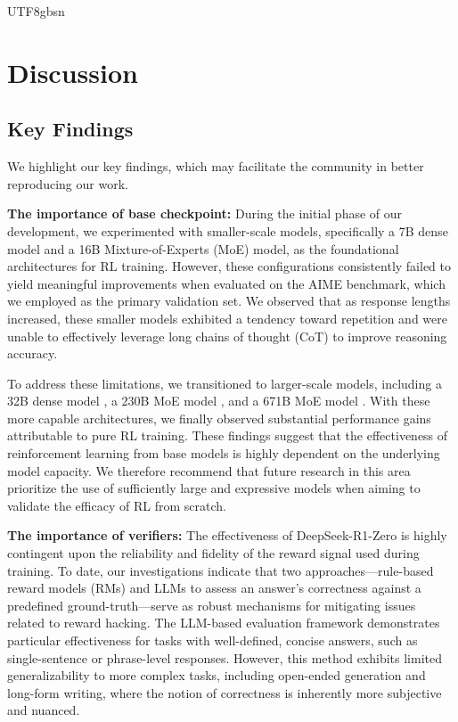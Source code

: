 \documentclass[11pt, a4paper, logo, copyright, nonumbering]{deepseek}
\newcommand{\dsro}{DeepSeek-R1-Zero}
\begin{document}
\begin{CJK*}{UTF8}{gbsn}
\section{Discussion}
\subsection{Key Findings}
We highlight our key findings, which may facilitate the community in better reproducing our work.

\textbf{The importance of base checkpoint: } During the initial phase of our development, we experimented with smaller-scale models, specifically a 7B dense model and a 16B Mixture-of-Experts (MoE) model, as the foundational architectures for RL training. However, these configurations consistently failed to yield meaningful improvements when evaluated on the AIME benchmark, which we employed as the primary validation set. We observed that as response lengths increased, these smaller models exhibited a tendency toward repetition and were unable to effectively leverage long chains of thought (CoT) to improve reasoning accuracy.

To address these limitations, we transitioned to larger-scale models, including a 32B dense model \citep{qwen2_5}, a 230B MoE model \citep{dsvii}, and a 671B MoE model \citep{dsviii}. With these more capable architectures, we finally observed substantial performance gains attributable to pure RL training. These findings suggest that the effectiveness of reinforcement learning from base models is highly dependent on the underlying model capacity. We therefore recommend that future research in this area prioritize the use of sufficiently large and expressive models when aiming to validate the efficacy of RL from scratch.

\textbf{The importance of verifiers: }The effectiveness of \dsro{} is highly contingent upon the reliability and fidelity of the reward signal used during training. To date, our investigations indicate that two approaches—rule-based reward models (RMs) and LLMs to assess an answer’s correctness against a predefined ground-truth—serve as robust mechanisms for mitigating issues related to reward hacking. The LLM-based evaluation framework demonstrates particular effectiveness for tasks with well-defined, concise answers, such as single-sentence or phrase-level responses. However, this method exhibits limited generalizability to more complex tasks, including open-ended generation and long-form writing, where the notion of correctness is inherently more subjective and nuanced.


\end{CJK*}
\end{document}
